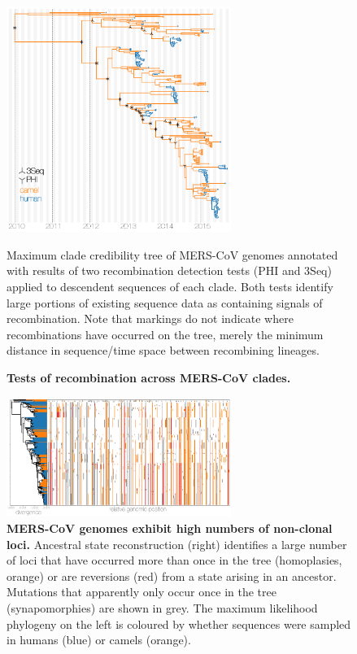 \documentclass[11pt,oneside,letterpaper]{article}
\begin{document}
\begin{figure}[h]
\centering
	\includegraphics[width=0.65\textwidth]{figures/mers_recombination.png}
	\caption{\textbf{Tests of recombination across MERS-CoV clades.}}
Maximum clade credibility tree of MERS-CoV genomes annotated with results of two recombination detection tests (PHI and 3Seq) applied to descendent sequences of each clade.
Both tests identify large portions of existing sequence data as containing signals of recombination.
Note that markings do not indicate where recombinations have occurred on the tree, merely the minimum distance in sequence/time space between recombining lineages.
	\label{recombination_tree}
\end{figure}

\begin{figure}[h]
\centering
	\includegraphics[width=0.65\textwidth]{figures/mers_incompatibilities.png}
	\caption{\textbf{MERS-CoV genomes exhibit high numbers of non-clonal loci.}
Ancestral state reconstruction (right) identifies a large number of loci that have occurred more than once in the tree (homoplasies, orange) or are reversions (red) from a state arising in an ancestor.
Mutations that apparently only occur once in the tree (synapomorphies) are shown in grey.
The maximum likelihood phylogeny on the left is coloured by whether sequences were sampled in humans (blue) or camels (orange).
	}
	\label{incompatibilities}
\end{figure}
\end{document}
